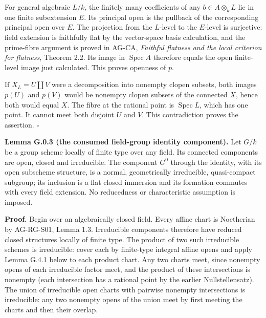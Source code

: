 \documentclass[11pt,a4paper,openany]{report}
\newcounter{none}
\begin{document}
For general algebraic \(L/k\), the finitely many coefficients of any \(b\in A\otimes_kL\) lie in one finite subextension \(E\). Its principal open is the pullback of the corresponding principal open over \(E\). The projection from the \(L\)-level to the \(E\)-level is surjective: field extension is faithfully flat by the vector-space basis calculation, and the prime-fibre argument is proved in AG-CA, \emph{Faithful flatness and the local criterion for flatness}, Theorem 2.2. Its image in \(\operatorname{Spec}A\) therefore equals the open finite-level image just calculated. This proves openness of \(p\).

If \(X_L=U\amalg V\) were a decomposition into nonempty clopen subsets, both images \(p(U)\) and \(p(V)\) would be nonempty clopen subsets of the connected \(X\), hence both would equal \(X\). The fibre at the rational point is \(\operatorname{Spec}L\), which has one point. It cannot meet both disjoint \(U\) and \(V\). This contradiction proves the assertion. \(\square\)

\label{AG-RG-S08-field-group-components}

\textbf{Lemma G.0.3 (the consumed field-group identity component).} Let \(G/k\) be a group scheme locally of finite type over any field. Its connected components are open, closed and irreducible. The component \(G^0\) through the identity, with its open subscheme structure, is a normal, geometrically irreducible, quasi-compact subgroup; its inclusion is a flat closed immersion and its formation commutes with every field extension. No reducedness or characteristic assumption is imposed.

\textbf{Proof.} Begin over an algebraically closed field. Every affine chart is Noetherian by AG-RG-S01, Lemma 1.3. Irreducible components therefore have reduced closed structures locally of finite type. The product of two such irreducible schemes is irreducible: cover each by finite-type integral affine opens and apply Lemma G.4.1 below to each product chart. Any two charts meet, since nonempty opens of each irreducible factor meet, and the product of these intersections is nonempty (each intersection has a rational point by the earlier Nullstellensatz). The union of irreducible open charts with pairwise nonempty intersections is irreducible: any two nonempty opens of the union meet by first meeting the charts and then their overlap.
\end{document}
